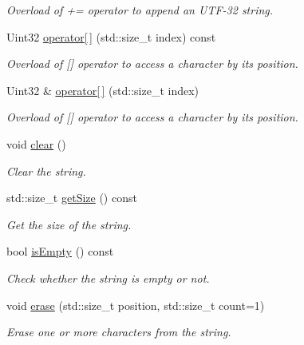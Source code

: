 \begin{DoxyCompactItemize}
\begin{DoxyCompactList}\small\item\em Overload of += operator to append an U\+T\+F-\/32 string. \end{DoxyCompactList}\item 
Uint32 \mbox{\hyperlink{classsf_1_1_string_a035c1b585a0ebed81e773ecafed57926}{operator\mbox{[}$\,$\mbox{]}}} (std\+::size\+\_\+t index) const
\begin{DoxyCompactList}\small\item\em Overload of \mbox{[}\mbox{]} operator to access a character by its position. \end{DoxyCompactList}\item 
Uint32 \& \mbox{\hyperlink{classsf_1_1_string_abc989da7f4fb873ab29188d40772ab24}{operator\mbox{[}$\,$\mbox{]}}} (std\+::size\+\_\+t index)
\begin{DoxyCompactList}\small\item\em Overload of \mbox{[}\mbox{]} operator to access a character by its position. \end{DoxyCompactList}\item 
void \mbox{\hyperlink{classsf_1_1_string_a391c1b4950cbf3d3f8040cea73af2969}{clear}} ()
\begin{DoxyCompactList}\small\item\em Clear the string. \end{DoxyCompactList}\item 
std\+::size\+\_\+t \mbox{\hyperlink{classsf_1_1_string_ae7aff54e178f5d3e399953adff5cad20}{get\+Size}} () const
\begin{DoxyCompactList}\small\item\em Get the size of the string. \end{DoxyCompactList}\item 
bool \mbox{\hyperlink{classsf_1_1_string_a2ba26cb6945d2bbb210b822f222aa7f6}{is\+Empty}} () const
\begin{DoxyCompactList}\small\item\em Check whether the string is empty or not. \end{DoxyCompactList}\item 
void \mbox{\hyperlink{classsf_1_1_string_aaa78a0a46b3fbe200a4ccdedc326eb93}{erase}} (std\+::size\+\_\+t position, std\+::size\+\_\+t count=1)
\begin{DoxyCompactList}\small\item\em Erase one or more characters from the string. \end{DoxyCompactList}\item 

\end{DoxyCompactItemize}
